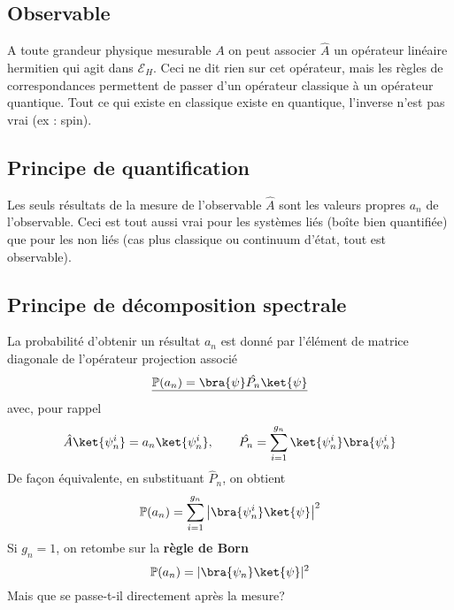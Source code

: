  \subsection{Observable}
 A toute grandeur physique mesurable $A$ on peut associer $\hat{A}$ un 
 opérateur linéaire hermitien qui agit dans $\mathcal{E}_H$. 
 Ceci ne dit rien sur cet opérateur, mais les règles de 
 correspondances permettent de passer d'un opérateur classique à un opérateur quantique. 
 Tout ce qui existe en classique existe en quantique, l'inverse n'est pas
 vrai (ex : spin).
 
 \subsection{Principe de quantification}
 Les seuls résultats de la mesure de l’observable $\hat{A}$ sont les 
 valeurs propres $a_n$ de l'observable. Ceci est tout aussi vrai pour les 
 systèmes liés (boîte bien quantifiée) que pour les non liés (cas plus classique ou 
 continuum d'état, tout est observable).
 
 \subsection{Principe de décomposition spectrale}
 La probabilité d'obtenir un résultat $a_n$ est donné par l'élément de 
 matrice diagonale de l'opérateur projection associé
 \begin{equation}
 \underline{\mathbb{P}(a_n) = \bra{\psi}\hat{P_n}\ket{\psi}}
 \end{equation}
 avec, pour rappel 
 \begin{equation}
 \hat{A}\ket{\psi_n^i} = a_n\ket{\psi_n^i},\qquad \hat{P_n} = \sum_{i=1}^{g_n} 
 \ket{\psi_n^i}\bra{\psi_n^i}
 \end{equation}
 De façon équivalente, en substituant $\hat{P}_n$, on obtient
 \begin{equation}
 \mathbb{P}(a_n) = \sum_{i=1}^{g_n} \left|\bra{\psi_n^i}\ket{\psi}\right|^2
 \end{equation}
 Si $g_n = 1$, on retombe sur la \textbf{règle de Born}
 \begin{equation}
 \mathbb{P}(a_n) = |\bra{\psi_n}\ket{\psi}|^2
 \end{equation}
 Mais que se passe-t-il directement après la mesure?
 
